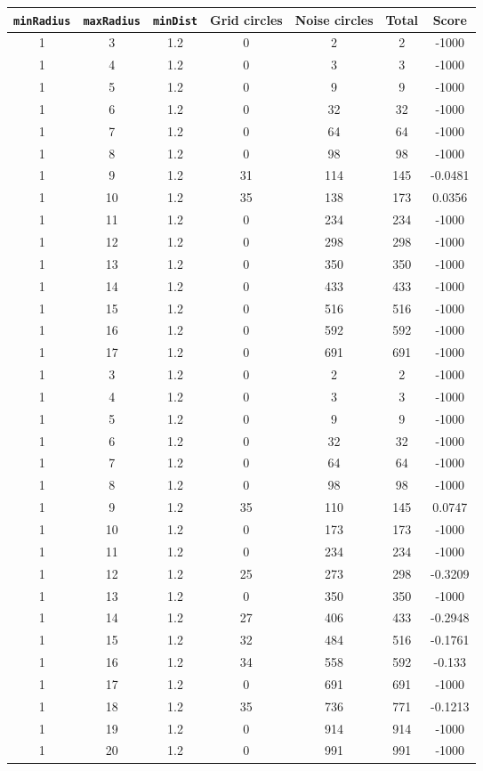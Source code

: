 \documentclass[letterpaper, 12pt]{article}
\begin{document}
\begin{longtable}{|c|c|c|c|c|c|c|}
\hline
\textbf{\texttt{minRadius}} & \textbf{\texttt{maxRadius}} & \textbf{\texttt{minDist}} & \textbf{Grid circles} & \textbf{Noise circles} & \textbf{Total} & \textbf{Score} \\
\hline
1 & 3 & 1.2 & 0 & 2 & 2 & -1000 \\
\hline
1 & 4 & 1.2 & 0 & 3 & 3 & -1000 \\
\hline
1 & 5 & 1.2 & 0 & 9 & 9 & -1000 \\
\hline
1 & 6 & 1.2 & 0 & 32 & 32 & -1000 \\
\hline
1 & 7 & 1.2 & 0 & 64 & 64 & -1000 \\
\hline
1 & 8 & 1.2 & 0 & 98 & 98 & -1000 \\
\hline
1 & 9 & 1.2 & 31 & 114 & 145 & -0.0481 \\
\hline
1 & 10 & 1.2 & 35 & 138 & 173 & 0.0356 \\
\hline
1 & 11 & 1.2 & 0 & 234 & 234 & -1000 \\
\hline
1 & 12 & 1.2 & 0 & 298 & 298 & -1000 \\
\hline
1 & 13 & 1.2 & 0 & 350 & 350 & -1000 \\
\hline
1 & 14 & 1.2 & 0 & 433 & 433 & -1000 \\
\hline
1 & 15 & 1.2 & 0 & 516 & 516 & -1000 \\
\hline
1 & 16 & 1.2 & 0 & 592 & 592 & -1000 \\
\hline
1 & 17 & 1.2 & 0 & 691 & 691 & -1000 \\
\hline
1 & 3 & 1.2 & 0 & 2 & 2 & -1000 \\
\hline
1 & 4 & 1.2 & 0 & 3 & 3 & -1000 \\
\hline
1 & 5 & 1.2 & 0 & 9 & 9 & -1000 \\
\hline
1 & 6 & 1.2 & 0 & 32 & 32 & -1000 \\
\hline
1 & 7 & 1.2 & 0 & 64 & 64 & -1000 \\
\hline
1 & 8 & 1.2 & 0 & 98 & 98 & -1000 \\
\hline
1 & 9 & 1.2 & 35 & 110 & 145 & 0.0747 \\
\hline
1 & 10 & 1.2 & 0 & 173 & 173 & -1000 \\
\hline
1 & 11 & 1.2 & 0 & 234 & 234 & -1000 \\
\hline
1 & 12 & 1.2 & 25 & 273 & 298 & -0.3209 \\
\hline
1 & 13 & 1.2 & 0 & 350 & 350 & -1000 \\
\hline
1 & 14 & 1.2 & 27 & 406 & 433 & -0.2948 \\
\hline
1 & 15 & 1.2 & 32 & 484 & 516 & -0.1761 \\
\hline
1 & 16 & 1.2 & 34 & 558 & 592 & -0.133 \\
\hline
1 & 17 & 1.2 & 0 & 691 & 691 & -1000 \\
\hline
1 & 18 & 1.2 & 35 & 736 & 771 & -0.1213 \\
\hline
1 & 19 & 1.2 & 0 & 914 & 914 & -1000 \\
\hline
1 & 20 & 1.2 & 0 & 991 & 991 & -1000 \\
\hline
\end{longtable}
\end{document}
